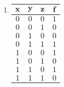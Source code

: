 \begin{enumerate}
        \item \begin{tabular}{|c|c|c|c|}
                  \hline
                  $\textbf{x}$ & $\textbf{y}$ & $\textbf{z}$ & $\textbf{f}$ \\
                  \hline
                  \hline
                  $0$ & $0$ & $0$ & $1$ \\
                  \hline
                  $0$ & $0$ & $1$ & $0$ \\
                  \hline
                  $0$ & $1$ & $0$ & $0$ \\
                  \hline
                  $0$ & $1$ & $1$ & $1$ \\
                  \hline
                  $1$ & $0$ & $0$ & $1$ \\
                  \hline
                  $1$ & $0$ & $1$ & $0$ \\
                  \hline
                  $1$ & $1$ & $0$ & $1$ \\
                  \hline
                  $1$ & $1$ & $1$ & $0$ \\
                  \hline
        \end{tabular}

    \end{enumerate}
